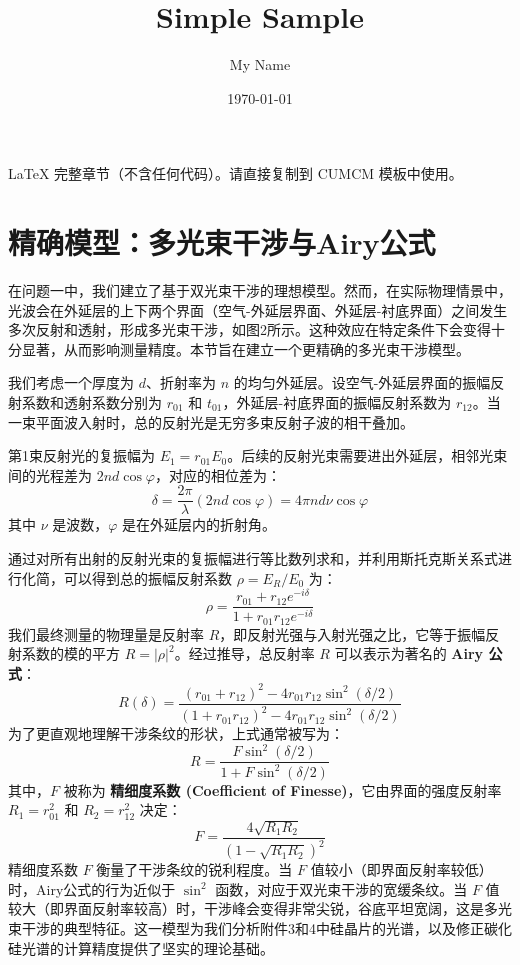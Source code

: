 \documentclass{ctexart} %
\title{Simple Sample} %
\author{My Name} %
\date{\today} %
\begin{document}
\maketitle %
LaTeX 完整章节（不含任何代码）。请直接复制到 CUMCM 模板中使用。
\section{精确模型：多光束干涉与Airy公式}

在问题一中，我们建立了基于双光束干涉的理想模型。然而，在实际物理情景中，光波会在外延层的上下两个界面（空气-外延层界面、外延层-衬底界面）之间发生多次反射和透射，形成多光束干涉，如图2所示。这种效应在特定条件下会变得十分显著，从而影响测量精度。本节旨在建立一个更精确的多光束干涉模型。

我们考虑一个厚度为 $d$、折射率为 $n$ 的均匀外延层。设空气-外延层界面的振幅反射系数和透射系数分别为 $r_{01}$ 和 $t_{01}$，外延层-衬底界面的振幅反射系数为 $r_{12}$。当一束平面波入射时，总的反射光是无穷多束反射子波的相干叠加。

第1束反射光的复振幅为 $E_1 = r_{01}E_0$。后续的反射光束需要进出外延层，相邻光束间的光程差为 $2nd\cos\varphi$，对应的相位差为：
$$
    \delta = \frac{2\pi}{\lambda} (2nd\cos\varphi) = 4\pi n d \nu \cos\varphi
$$
其中 $\nu$ 是波数，$\varphi$ 是在外延层内的折射角。

通过对所有出射的反射光束的复振幅进行等比数列求和，并利用斯托克斯关系式进行化简，可以得到总的振幅反射系数 $\rho = E_R / E_0$ 为：
$$
    \rho = \frac{r_{01} + r_{12} e^{-i\delta}}{1 + r_{01} r_{12} e^{-i\delta}}
$$
我们最终测量的物理量是反射率 $R$，即反射光强与入射光强之比，它等于振幅反射系数的模的平方 $R = |\rho|^2$。经过推导，总反射率 $R$ 可以表示为著名的 \textbf{Airy 公式}：
$$
    R(\delta) = \frac{(r_{01} + r_{12})^2 - 4r_{01}r_{12}\sin^2(\delta/2)}{(1 + r_{01}r_{12})^2 - 4r_{01}r_{12}\sin^2(\delta/2)}
$$
为了更直观地理解干涉条纹的形状，上式通常被写为：
$$
    R = \frac{F \sin^2(\delta/2)}{1 + F \sin^2(\delta/2)}
$$
其中，$F$ 被称为 \textbf{精细度系数 (Coefficient of Finesse)}，它由界面的强度反射率 $R_1 = r_{01}^2$ 和 $R_2 = r_{12}^2$ 决定：
$$
    F = \frac{4\sqrt{R_1 R_2}}{(1-\sqrt{R_1 R_2})^2}
$$
精细度系数 $F$ 衡量了干涉条纹的锐利程度。当 $F$ 值较小（即界面反射率较低）时，Airy公式的行为近似于 $\sin^2$ 函数，对应于双光束干涉的宽缓条纹。当 $F$ 值较大（即界面反射率较高）时，干涉峰会变得非常尖锐，谷底平坦宽阔，这是多光束干涉的典型特征。这一模型为我们分析附件3和4中硅晶片的光谱，以及修正碳化硅光谱的计算精度提供了坚实的理论基础。
\end{document}
